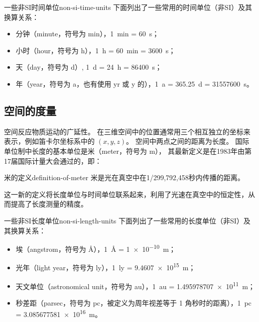\begin{note}{一些非SI时间单位}{non-si-time-units}
    下面列出了一些常用的时间单位（非SI）及其换算关系：
    \begin{itemize}
        \item 分钟（minute，符号为 min），\qty{1}{\minute} = \qty{60}{\second}；
        \item 小时（hour，符号为 h），\qty{1}{\hour} = \qty{60}{\minute} = \qty{3600}{\second}；
        \item 天（day，符号为 d）, \qty{1}{d} = \qty{24}{\hour} = \qty{86400}{\second}；
        \item 年（year，符号为 a，也有使用 yr 或 y 的），\qty{1}{a} = \qty{365.25}{d} = \qty{31557600}{\second}。
    \end{itemize}
\end{note}


\subsection{空间的度量}\label{subsec:space-measurement}

空间反应物质运动的广延性。
在三维空间中的位置通常用三个相互独立的坐标来表示，例如笛卡尔坐标系中的 $(x, y, z)$。
空间中两点之间的距离为长度。
国际单位制中长度的基本单位是米（meter，符号为 m），
其最新定义是在1983年由第17届国际计量大会通过的，即：
\begin{definition}{米的定义}{definition-of-meter}
    米是光在真空中在1/299,792,458秒内传播的距离。
\end{definition}
这一新的定义将长度单位与时间单位联系起来，利用了光速在真空中的恒定性，从而提高了长度测量的精度。

\begin{note}{一些非SI长度单位}{non-si-length-units}
    下面列出了一些常用的长度单位（非SI）及其换算关系：
    \begin{itemize}
        \item 埃（angstrom，符号为 \AA），\qty{1}{\angstrom} = \qty{1e-10}{m}；
        \item 光年（light year，符号为 ly），\qty{1}{ly} = \qty{9.4607e15}{m}；
        \item 天文单位（astronomical unit，符号为 au），\qty{1}{au} = \qty{1.495978707e11}{m}；
        \item 秒差距（parsec，符号为 pc，被定义为周年视差等于 1 角秒时的距离），\qty{1}{pc} = \qty{3.085677581e16}{m}。
    \end{itemize}
\end{note}

